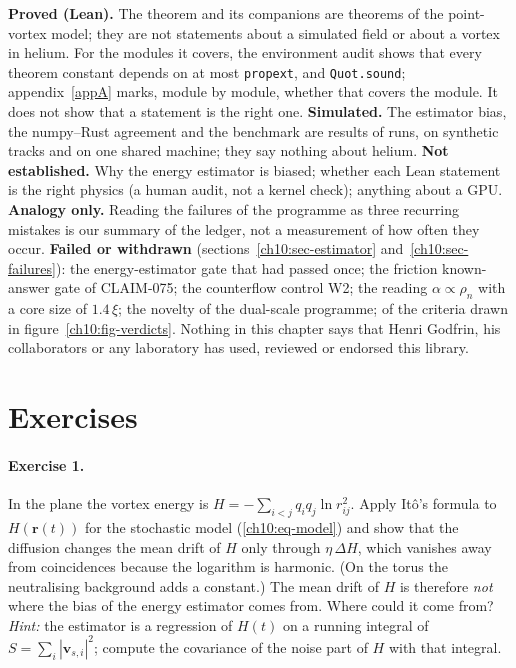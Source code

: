 \begin{honestbox}
\textbf{Proved (Lean).} The theorem  and its companions are theorems of the point-vortex model;
they are not statements about a simulated field or about a vortex in helium. For the modules it covers, the environment audit shows that every
theorem constant depends on at most \texttt{propext},  and \texttt{Quot.sound}; appendix~\ref{appA} marks, module by module,
whether that covers the module. It does not show that a statement is the right one. \textbf{Simulated.} The estimator bias, the numpy--Rust agreement
and the benchmark are results of runs, on synthetic tracks and on one shared machine; they say nothing about helium. \textbf{Not established.} Why the
energy estimator is biased; whether each Lean statement is the right physics (a human audit, not a kernel check); anything about a GPU.
\textbf{Analogy only.} Reading the failures of the programme as three recurring mistakes is our summary of the ledger, not a measurement of how often
they occur. \textbf{Failed or withdrawn} (sections~\ref{ch10:sec-estimator} and~\ref{ch10:sec-failures}): the energy-estimator gate that had passed
once; the friction known-answer gate of CLAIM-075; the counterflow control W2; the reading $\alpha\propto\rho_n$ with a core size of $1.4\,\xi$; the novelty
of the dual-scale programme; \NxVerdNotmet{} of the \NxVerdCells{} criteria drawn in figure~\ref{ch10:fig-verdicts}. Nothing in this chapter says that
Henri Godfrin, his collaborators or any laboratory has used, reviewed or endorsed this library.
\end{honestbox}

\section*{Exercises}

\paragraph{Exercise 1.} In the plane the vortex energy is $H=-\sum_{i<j}q_iq_j\ln r_{ij}^2$. Apply Itô's formula to $H(\mathbf r(t))$ for the
stochastic model (\ref{ch10:eq-model}) and show that the diffusion changes the mean drift of $H$ only through $\eta\,\Delta H$, which vanishes away from
coincidences because the logarithm is harmonic. (On the torus the neutralising background adds a constant.) The mean drift of $H$ is therefore
\emph{not} where the bias of the energy estimator comes from. Where could it come from? \emph{Hint:} the estimator is a regression of $H(t)$ on a running
integral of $S=\sum_i|\mathbf v_{s,i}|^2$; compute the covariance of the noise part of $H$ with that integral.


